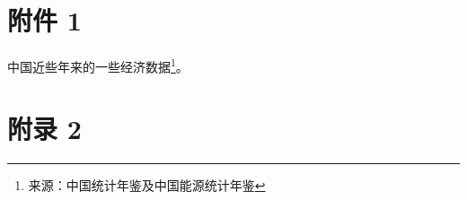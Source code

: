 \documentclass[hyperref, UTF8, cs4size, titlepage]{ctexart}
\begin{document}
  

  
  \clearpage

  \tableofcontents
  \thispagestyle{empty}
  \clearpage


  
  \clearpage

  
  \clearpage

  

  

  
  \clearpage

  

  
  \clearpage

  
  \clearpage

  \printindex

  \appendix

  \section{附件 1}
    中国近些年来的一些经济数据\footnote{来源：中国统计年鉴及中国能源统计年鉴}。
    \label{sec:fujian1}

  \section{附录 2}
\end{document}
